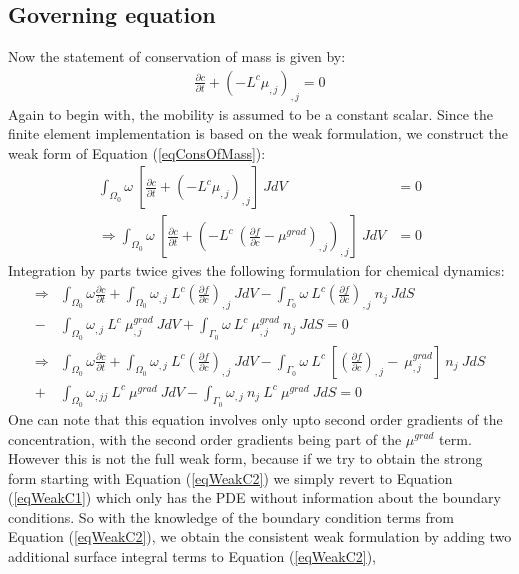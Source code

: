 \subsection{Governing equation}
\noindent Now the statement of conservation of mass is given by:
\begin{align}
 \frac{\partial c }{\partial t} + (-L^{c} \mu_{,j})_{,j} = 0 
 \label{eqConsOfMass}
\end{align}  
Again to begin with, the mobility is assumed to be a constant scalar. Since the finite element implementation is based on the weak formulation, we construct the weak form of Equation (\ref{eqConsOfMass}):
\begin{align}
\int_{\Omega_0}  \omega ~\left[  \frac{\partial  c }{\partial t} + \left(-L^c \mu_{,j} \right)_{,j} \right] ~J dV &= 0 \nonumber \\
\Rightarrow \int_{\Omega_0}  \omega ~\left[  \frac{\partial  c }{\partial t} + \left(-L^c ~\left( \frac{\partial f}{\partial c} - \mu^{grad} \right)_{,j} \right)_{,j} \right] ~J dV &= 0
\label{eqWeakC1}
\end{align}
Integration by parts twice gives the following formulation for chemical dynamics:
\begin{align}
\Rightarrow &\int_{\Omega_0}  \omega \frac{\partial  c }{\partial t} + \int_{\Omega_0}  \omega_{,j} ~L^c \left(\frac{\partial f}{\partial c}\right)_{,j} ~J dV -\int_{\Gamma_0}  \omega ~L^c \left(\frac{\partial f}{\partial c}\right)_{,j} ~n_{j} ~J dS  \nonumber \\
- &\int_{\Omega_0}  \omega_{,j} ~L^c ~\mu^{grad}_{,j} ~J dV + \int_{\Gamma_0}  \omega ~L^c ~\mu^{grad}_{,j} ~n_{j} ~J dS = 0 \\
\Rightarrow &\int_{\Omega_0}  \omega \frac{\partial  c }{\partial t} + \int_{\Omega_0}  \omega_{,j} ~L^c \left(\frac{\partial f}{\partial c}\right)_{,j} ~J dV -\int_{\Gamma_0}  \omega ~L^c ~\left[ \left(\frac{\partial f}{\partial c}\right)_{,j} - ~\mu^{grad}_{,j} \right] ~n_{j} ~J dS  \nonumber \\
+ &\int_{\Omega_0}  \omega_{,jj} ~L^c ~\mu^{grad} ~J dV - \int_{\Gamma_0}  \omega_{,j}  ~n_{j} ~L^c ~\mu^{grad} ~J dS  = 0
\label{eqWeakC2}
\end{align}
One can note that this equation involves only upto second order gradients of the concentration, with the second order gradients being part of the $\mu^{grad}$ term. However this is not the full weak form, because if we try to obtain the strong form starting with Equation (\ref{eqWeakC2}) we simply revert to Equation (\ref{eqWeakC1}) which only has the PDE without information about the boundary conditions. So with the knowledge of the boundary condition terms from Equation (\ref{eqWeakC2}), we obtain the consistent weak formulation by adding two additional surface integral terms to Equation (\ref{eqWeakC2}),
